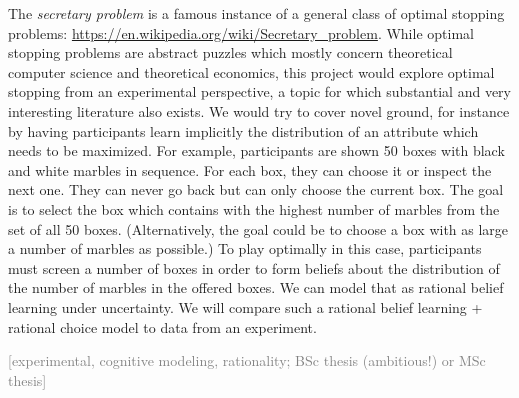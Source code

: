 \documentclass[fleqn,reqno,10pt]{article}
\newcommand{\scope}[1]{\hfill\textcolor{gray}{[#1]}}
\begin{document}
The \emph{secretary problem} is a famous instance of a general class of optimal stopping
problems: \url{https://en.wikipedia.org/wiki/Secretary_problem}. While optimal stopping
problems are abstract puzzles which mostly concern theoretical computer science and theoretical
economics, this project would explore optimal stopping from an experimental perspective, a
topic for which substantial and very interesting literature also exists. We would try to cover
novel ground, for instance by having participants learn implicitly the distribution of an
attribute which needs to be maximized. For example, participants are shown 50 boxes with black
and white marbles in sequence. For each box, they can choose it or inspect the next one. They
can never go back but can only choose the current box. The goal is to select the box which
contains with the highest number of marbles from the set of all 50 boxes. (Alternatively, the
goal could be to choose a box with as large a number of marbles as possible.) To play optimally
in this case, participants must screen a number of boxes in order to form beliefs about the
distribution of the number of marbles in the offered boxes. We can model that as rational
belief learning under uncertainty. We will compare such a rational belief learning + rational
choice model to data from an experiment.

\scope{experimental, cognitive modeling, rationality; BSc thesis (ambitious!) or MSc thesis}

\printbibliography[heading=bibintoc]
\end{document}

